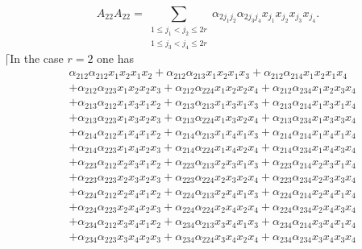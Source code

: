 \documentclass[aps, preprint]{revtex4}
\begin{document}
\begin{equation}A_{2 2} A_{2 2} =\sum _{\begin{array}{c}1 \leq j_{1} <j_{2} \leq 2 r \\
1 \leq j_{3} <j_{4} \leq 2 r\end{array}}\alpha _{2 j_{1} j_{2}} \alpha _{2 j_{3} j_{4}} x_{j_{1}} x_{j_{2}} x_{j_{3}} x_{j_{4}}\text{.}
\end{equation}$\lceil $In the case $r =2$ one has
\begin{align} & \alpha _{2 1 2} \alpha _{2 1 2} x_{1} x_{2} x_{1} x_{2} +\alpha _{2 1 2} \alpha _{2 1 3} x_{1} x_{2} x_{1} x_{3} +\alpha _{2 1 2} \alpha _{2 1 4} x_{1} x_{2} x_{1} x_{4} \nonumber  \\
 &  +\alpha _{2 1 2} \alpha _{2 2 3} x_{1} x_{2} x_{2} x_{3} +\alpha _{2 1 2} \alpha _{2 2 4} x_{1} x_{2} x_{2} x_{4} +\alpha _{2 1 2} \alpha _{2 3 4} x_{1} x_{2} x_{3} x_{4} \nonumber  \\
 &  +\alpha _{2 1 3} \alpha _{2 1 2} x_{1} x_{3} x_{1} x_{2} +\alpha _{2 1 3} \alpha _{2 1 3} x_{1} x_{3} x_{1} x_{3} +\alpha _{2 1 3} \alpha _{2 1 4} x_{1} x_{3} x_{1} x_{4} \nonumber  \\
 &  +\alpha _{2 1 3} \alpha _{2 2 3} x_{1} x_{3} x_{2} x_{3} +\alpha _{2 1 3} \alpha _{2 2 4} x_{1} x_{3} x_{2} x_{4} +\alpha _{2 1 3} \alpha _{2 3 4} x_{1} x_{3} x_{3} x_{4} \nonumber  \\
 &  +\alpha _{2 1 4} \alpha _{2 1 2} x_{1} x_{4} x_{1} x_{2} +\alpha _{2 1 4} \alpha _{2 1 3} x_{1} x_{4} x_{1} x_{3} +\alpha _{2 1 4} \alpha _{2 1 4} x_{1} x_{4} x_{1} x_{4} \nonumber  \\
 &  +\alpha _{2 1 4} \alpha _{2 2 3} x_{1} x_{4} x_{2} x_{3} +\alpha _{2 1 4} \alpha _{2 2 4} x_{1} x_{4} x_{2} x_{4} +\alpha _{2 1 4} \alpha _{2 3 4} x_{1} x_{4} x_{3} x_{4} \nonumber  \\
 &  +\alpha _{2 2 3} \alpha _{2 1 2} x_{2} x_{3} x_{1} x_{2} +\alpha _{2 2 3} \alpha _{2 1 3} x_{2} x_{3} x_{1} x_{3} +\alpha _{2 2 3} \alpha _{2 1 4} x_{2} x_{3} x_{1} x_{4} \nonumber  \\
 &  +\alpha _{2 2 3} \alpha _{2 2 3} x_{2} x_{3} x_{2} x_{3} +\alpha _{2 2 3} \alpha _{2 2 4} x_{2} x_{3} x_{2} x_{4} +\alpha _{2 2 3} \alpha _{2 3 4} x_{2} x_{3} x_{3} x_{4} \nonumber  \\
 &  +\alpha _{2 2 4} \alpha _{2 1 2} x_{2} x_{4} x_{1} x_{2} +\alpha _{2 2 4} \alpha _{2 1 3} x_{2} x_{4} x_{1} x_{3} +\alpha _{2 2 4} \alpha _{2 1 4} x_{2} x_{4} x_{1} x_{4} \nonumber  \\
 &  +\alpha _{2 2 4} \alpha _{2 2 3} x_{2} x_{4} x_{2} x_{3} +\alpha _{2 2 4} \alpha _{2 2 4} x_{2} x_{4} x_{2} x_{4} +\alpha _{2 2 4} \alpha _{2 3 4} x_{2} x_{4} x_{3} x_{4} \nonumber  \\
 &  +\alpha _{2 3 4} \alpha _{2 1 2} x_{3} x_{4} x_{1} x_{2} +\alpha _{2 3 4} \alpha _{2 1 3} x_{3} x_{4} x_{1} x_{3} +\alpha _{2 3 4} \alpha _{2 1 4} x_{3} x_{4} x_{1} x_{4} \nonumber  \\
 &  +\alpha _{2 3 4} \alpha _{2 2 3} x_{3} x_{4} x_{2} x_{3} +\alpha _{2 3 4} \alpha _{2 2 4} x_{3} x_{4} x_{2} x_{4} +\alpha _{2 3 4} \alpha _{2 3 4} x_{3} x_{4} x_{3} x_{4}\end{align}
\end{document}
